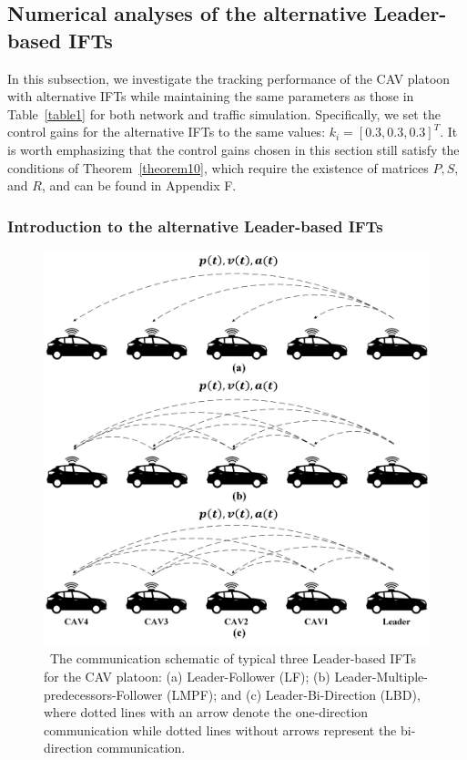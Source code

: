 \documentclass[a4paper]{cas-sc}
\begin{document}
\subsection{Numerical analyses of the alternative Leader-based IFTs}
\label{Section 5.3}

In this subsection, we investigate the tracking performance of the CAV platoon with alternative IFTs while maintaining the same parameters as those in Table~\ref{table1} for both network and traffic simulation. Specifically, we set the control gains for the alternative IFTs to the same values: ${k_i} = {[0.3,0.3,0.3]^T}$. It is worth emphasizing that the control gains chosen in this section still satisfy the conditions of Theorem~\ref{theorem10}, which require the existence of matrices $P, S,$ and $R$, and can be found in Appendix F.

\subsubsection{Introduction to the alternative Leader-based IFTs}
\label{Section 5.1.2}

\begin{figure}
  \centering
  \includegraphics[width=12cm]{figs/other_three.png}
  \caption{~The communication schematic of typical three Leader-based IFTs for the CAV platoon: (a) Leader-Follower (LF); (b) Leader-Multiple-predecessors-Follower (LMPF); and (c) Leader-Bi-Direction (LBD), where dotted lines with an arrow denote the one-direction communication while dotted lines without arrows represent the bi-direction communication.}
  \label{figXX}
\end{figure}
\end{document}

